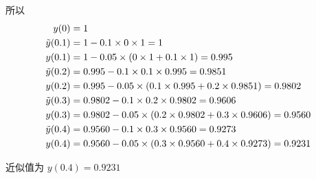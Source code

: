 \documentclass{article}
\begin{document}

所以
$$
\begin{aligned}
y(0) &= 1 \\
\Tilde{y}(0.1) &= 1 - 0.1\times 0\times 1 = 1 \\
y(0.1) &= 1 - 0.05\times (0\times 1 + 0.1\times 1) = 0.995 \\
\Tilde{y}(0.2) &= 0.995 - 0.1\times 0.1\times 0.995 = 0.9851 \\
y(0.2) &= 0.995 - 0.05\times (0.1\times 0.995 + 0.2\times 0.9851) = 0.9802 \\
\Tilde{y}(0.3) &= 0.9802 - 0.1\times 0.2\times 0.9802 = 0.9606 \\
y(0.3) &= 0.9802 - 0.05\times (0.2\times 0.9802 + 0.3\times 0.9606) = 0.9560 \\
\Tilde{y}(0.4) &= 0.9560 - 0.1\times 0.3\times 0.9560 = 0.9273 \\
y(0.4) &= 0.9560 - 0.05\times (0.3\times 0.9560 + 0.4\times 0.9273) = 0.9231
\end{aligned}
$$

近似值为 $y(0.4) = 0.9231$
\end{document}
